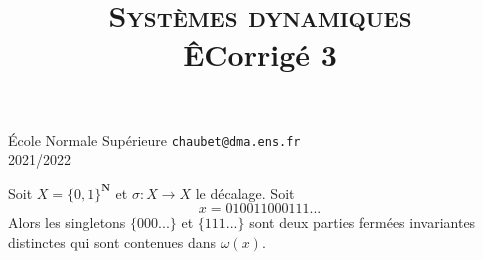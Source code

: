 \documentclass[a4paper,12pt,openany]{article}
\title{\textsc{Syst\`emes dynamiques} \\ÊCorrig\'e 3}
\date{}
\author{}
\theoremstyle{plain}
\theoremstyle{definition}
\newcommand{\N}{\mathbf{N}}
\begin{document}
{\noindent \'Ecole Normale Sup\'erieure  \hfill \texttt{chaubet@dma.ens.fr}} \\
{2021/2022 \hfill}

{\let\newpage\relax\maketitle}
\maketitle

 \vspace{1.5mm} 

\noindent Soit $X = \{0, 1\}^\N$ et $\sigma : X \to X$ le d\'ecalage. Soit
$$
x = 010011000111...
$$
Alors les singletons $\{000...\}$ et $\{111...\}$ sont deux parties ferm\'ees invariantes distinctes qui sont contenues dans $\omega(x)$.
\vspace{0.6cm}

 \vspace{1.5mm} 
\end{document}
